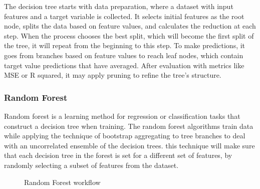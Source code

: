 The decision tree starts with data preparation, where a dataset with input features and a target variable is collected. It selects initial features as the root node, splits the data based on feature values, and calculates the reduction at each step. When the process chooses the best split, which will become the first split of the tree, it will repeat from the beginning to this step. To make predictions, it goes from branches based on feature values to reach leaf nodes, which contain target value predictions that have averaged. After evaluation with metrics like MSE or R squared, it may apply pruning to refine the tree’s structure. 

\subsubsection{Random Forest}
Random forest is a learning method for regression or classification tasks that construct a decision tree when training. 
The random forest algorithms train data while applying the technique of bootstrap aggregating to tree branches to deal with an uncorrelated ensemble of the decision trees. this technique will make sure that each decision tree in the forest is set for a different set of features, by randomly selecting a subset of features from the dataset. 


\begin{figure}[h]
\centering
\caption{Random Forest workflow} \label{fig:result-checkpoint-micro}
\end{figure}

